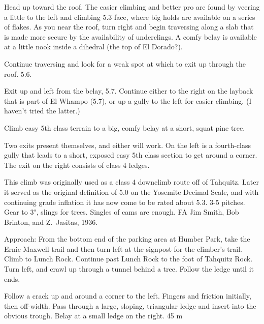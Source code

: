 \documentclass{tahquitz}
\begin{document}
 Head up toward the roof. The easier climbing and better pro are found
by veering a little to the left and climbing 5.3 face, where big holds are available on a series of flakes.
As you near the roof, turn right and begin traversing
along a slab that is made more secure by the availability of underclings. A comfy
belay is available at a little nook inside a dihedral (the top of El Dorado?).

 Continue traversing and look for a weak spot at which to exit up through the roof. 5.6.

 Exit up and left from the belay, 5.7. Continue either to the right on the layback
that is part of El Whampo (5.7), or up a gully to the left for easier climbing. (I haven't tried
the latter.)

 Climb easy 5th class terrain to a big, comfy belay at a short, squat pine tree.

 Two exits present themselves, and either will work. On the left is a fourth-class
gully that leads to a short, exposed easy 5th class section to get around a corner.
The exit on the right consists of class 4 ledges.

\somespace

\northgully




This climb was originally used as a class 4 downclimb route off of Tahquitz.
Later it served as the original definition of 5.0 on the Yosemite Decimal
Scale, and with continuing grade inflation it has now come to be
rated about 5.3. 3-5 pitches. Gear to 3",
slings for trees. Singles of cams are enough.
FA Jim Smith, Bob Brinton, and Z.~Jasitas, 1936.

Approach: From the bottom end of the parking area at Humber Park,
take the Ernie Maxwell trail and then turn left at the signpost for
the climber's trail. Climb to Lunch Rock. Continue past Lunch Rock to
the foot of Tahquitz Rock. Turn left, and crawl up through a tunnel
behind a tree. Follow the ledge until it ends.

\somespace

 Follow a crack up and around a corner to the left. Fingers and
friction initially, then off-width. Pass through a large, sloping,
triangular ledge and insert into the obvious trough. Belay at a small
ledge on the right. 45 m
\end{document}
